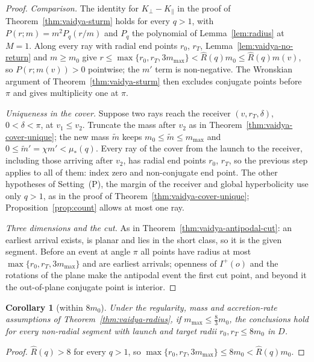 \documentclass[aip,jmp,amsmath,amssymb,reprint]{revtex4-2}
\theoremstyle{plain}
\newtheorem{corollary}[proposition]{Corollary}
\theoremstyle{definition}
\begin{document}
\begin{proof}
\emph{Comparison.} The identity for $K_\perp-K_\parallel$ in the proof of Theorem~\ref{thm:vaidya-sturm} holds for every
$q>1$, with $P(r;m)=m^2P_q(r/m)$ and $P_q$ the polynomial of Lemma~\ref{lem:radius} at $M=1$. Along every
ray with radial end points $r_0$, $r_T$, Lemma~\ref{lem:vaidya-no-return} and $m\ge m_0$ give
$r\le\max\{r_0,r_T,3m_{\max}\}<\widehat R(q)m_0\le\widehat R(q)m(v)$, so $P(r;m(v))>0$ pointwise; the $m'$ term is
non-negative. The Wronskian argument of Theorem~\ref{thm:vaidya-sturm} then excludes conjugate points before
$\pi$ and gives multiplicity one at $\pi$.

\emph{Uniqueness in the cover.} Suppose two rays reach the receiver $(v,r_T,\delta)$, $0<\delta<\pi$, at
$v_1\le v_2$. Truncate the mass after $v_2$ as in Theorem~\ref{thm:vaidya-cover-unique}; the new mass
$\widetilde m$ keeps $m_0\le\widetilde m\le m_{\max}$ and $0\le\widetilde m'=\chi m'<\mu_*(q)$. Every ray of the cover from the
launch to the receiver, including those arriving after $v_2$, has radial end points $r_0$, $r_T$, so the
previous step applies to all of them: index zero and non-conjugate end point. The other hypotheses of
Setting~(P), the margin of the receiver and global hyperbolicity use only $q>1$, as in the proof of
Theorem~\ref{thm:vaidya-cover-unique}; Proposition~\ref{prop:count} allows at most one ray.

\emph{Three dimensions and the cut.} As in Theorem~\ref{thm:vaidya-antipodal-cut}: an earliest arrival exists, is
planar and lies in the short class, so it is the given segment. Before an event at angle $\pi$ all
points have radius at most $\max\{r_0,r_T,3m_{\max}\}$ and are earliest arrivals; openness of $I^+(o)$ and the
rotations of the plane make the antipodal event the first cut point, and beyond it the out-of-plane
conjugate point is interior.
\end{proof}

\begin{corollary}[within $8m_0$]\label{cor:vaidya-8m}
Under the regularity, mass and accretion-rate assumptions of Theorem~\ref{thm:vaidya-radius}, if $m_{\max}\le\frac83m_0$, the
conclusions hold for every non-radial segment with launch and target radii $r_0,r_T\le8m_0$ in $D$.
\end{corollary}

\begin{proof}
$\widehat R(q)>8$ for every $q>1$, so $\max\{r_0,r_T,3m_{\max}\}\le8m_0<\widehat R(q)m_0$.
\end{proof}
\end{document}
